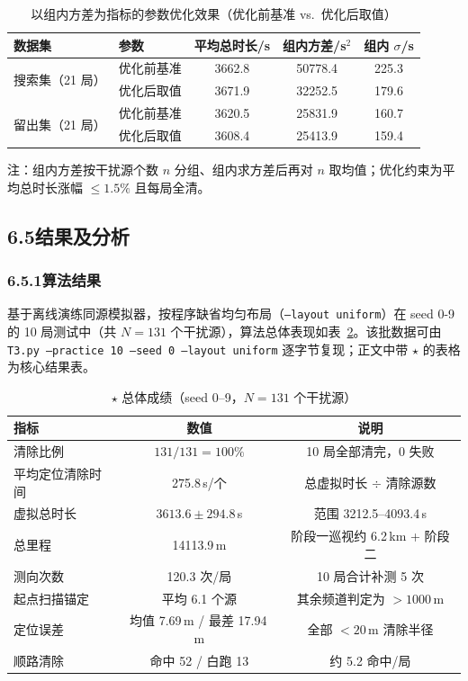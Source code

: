\documentclass[UTF8, zihao=5,AutoFakeBold=2]{ctexart}
\begin{document}
\begin{table}[H]
    \centering
    \caption{以组内方差为指标的参数优化效果（优化前基准 vs.\ 优化后取值）}
    \label{tab:t3-var}
    \begin{tabular}{llccc}
        \toprule
        数据集 & 参数 & 平均总时长/s & 组内方差/s\(^2\) & 组内 \(\sigma\)/s \\
        \midrule
        \multirow{2}{*}{搜索集（21 局）} & 优化前基准 & 3662.8 & 50778.4 & 225.3 \\
                                        & 优化后取值 & 3671.9 & 32252.5 & 179.6 \\
        \multirow{2}{*}{留出集（21 局）} & 优化前基准 & 3620.5 & 25831.9 & 160.7 \\
                                        & 优化后取值 & 3608.4 & 25413.9 & 159.4 \\
        \bottomrule
    \end{tabular}
    \par\smallskip
    \footnotesize{注：组内方差按干扰源个数 \(n\) 分组、组内求方差后再对 \(n\) 取均值；优化约束为平均总时长涨幅 \(\le 1.5\%\) 且每局全清。}
\end{table}

\subsection*{6.5结果及分析}

\subsubsection*{6.5.1算法结果}
基于离线演练同源模拟器，按程序缺省均匀布局（\texttt{--layout uniform}）在 seed 0-9 的 10 局测试中（共 \(N=131\) 个干扰源），算法总体表现如表~\ref{tab:t3-overall}。该批数据可由 \texttt{T3.py --practice 10 --seed 0 --layout uniform} 逐字节复现；正文中带 $\star$ 的表格为核心结果表。

\begin{table}[H]
    \centering
    \caption{$\star$ 总体成绩（seed 0--9，\(N=131\) 个干扰源）}
    \label{tab:t3-overall}
    \begin{tabular}{lcc}
        \toprule
        指标 & 数值 & 说明 \\
        \midrule
        清除比例 & \(131/131=100\%\) & 10 局全部清完，0 失败 \\
        平均定位清除时间 & 275.8\,s/个 & 总虚拟时长 \(\div\) 清除源数 \\
        虚拟总时长 & \(3613.6\pm294.8\)\,s & 范围 3212.5--4093.4\,s \\
        总里程 & 14113.9\,m & 阶段一巡视约 6.2\,km + 阶段二 \\
        测向次数 & 120.3 次/局 & 10 局合计补测 5 次 \\
        起点扫描锚定 & 平均 6.1 个源 & 其余频道判定为 \(>1000\)\,m \\
        定位误差 & 均值 7.69\,m / 最差 17.94\,m & 全部 \(<20\)\,m 清除半径 \\
        顺路清除 & 命中 52 / 白跑 13 & 约 5.2 命中/局 \\
        \bottomrule
    \end{tabular}
\end{table}
\end{document}
